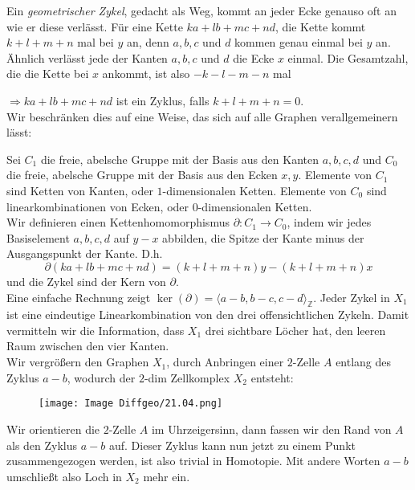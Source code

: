 \documentclass[fleqn, 12pt, letterpaper]{article}
\begin{document}
Ein \emph{geometrischer Zykel}, gedacht als Weg, kommt an jeder Ecke genauso oft an wie er diese verlässt. Für eine Kette \(ka + lb + mc + nd\), die Kette kommt \(k+l+m+n\) mal bei \(y\) an, denn \(a, b, c\) und \(d\) kommen genau einmal bei \(y\) an.
Ähnlich verlässt jede der Kanten \(a, b, c\) und \(d\) die Ecke \(x\) einmal. Die Gesamtzahl, die die Kette bei \(x\) ankommt, ist also
\(
-k - l - m - n
\) mal

\(\Rightarrow ka + lb + mc + nd\) ist ein Zyklus, falls \(k + l + m + n = 0\).\\

Wir beschränken dies auf eine Weise, das sich auf alle Graphen verallgemeinern lässt:

Sei \(C_1\) die freie, abelsche Gruppe mit der Basis aus den Kanten \(a, b, c, d\) und \(C_0\) die freie, abelsche Gruppe mit der Basis aus den Ecken \(x, y\).
Elemente von \(C_1\) sind Ketten von Kanten, oder \(1\)-dimensionalen Ketten.  
Elemente von \(C_0\) sind linearkombinationen von Ecken, oder \(0\)-dimensionalen Ketten.\\

Wir definieren einen Kettenhomomorphismus \(\partial: C_1 \to C_0\), indem wir jedes Basiselement \(a, b, c, d\) auf \(y - x\) abbilden, die Spitze der Kante minus der Ausgangspunkt der Kante.
D.h.
\[
\partial(ka + lb + mc + nd) = (k + l + m + n)y - (k + l + m + n)x
\]
und die Zykel sind der Kern von \(\partial\). \\

Eine einfache Rechnung zeigt \(\ker(\partial) = \langle a-b,b-c,c-d\rangle_\mathbb{Z}\). Jeder Zykel in \(X_1\) ist eine eindeutige Linearkombination von den drei offensichtlichen Zykeln. Damit vermitteln wir die Information, dass \(X_1\) drei sichtbare Löcher hat, den leeren Raum zwischen den vier Kanten.\\

Wir vergrößern den Graphen \(X_1\), durch Anbringen einer \(2\)-Zelle \(A\) entlang des Zyklus \(a - b\), wodurch der \(2\)-dim Zellkomplex \(X_2\) entsteht:

\begin{figure}[H]
    \centering
    \texttt{[image: Image Diffgeo/21.04.png]}

 \end{figure}

Wir orientieren die \(2\)-Zelle \(A\) im Uhrzeigersinn, dann fassen wir den Rand von \(A\) als den Zyklus \(a - b\) auf. Dieser Zyklus kann nun jetzt zu einem Punkt zusammengezogen werden, ist also trivial in Homotopie. Mit andere Worten \(a - b\) umschließt also Loch in \(X_2\) mehr ein.\\
\end{document}
